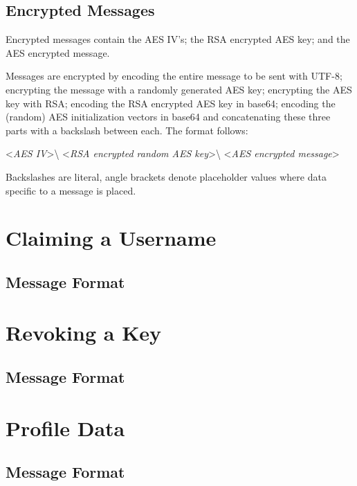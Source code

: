 
\subsection{Encrypted Messages}
Encrypted messages contain the AES IV's; the RSA encrypted AES key; and the AES
encrypted message.

Messages are encrypted by encoding the entire message to be sent with UTF-8;
encrypting the message with a randomly generated AES key; encrypting the AES key
with RSA; encoding the RSA encrypted AES key in base64; encoding the (random)
AES initialization vectors in base64 and concatenating these three parts with a
backslash between each. The format follows:

\begin{center}
\textless \textit{AES IV}\textgreater\textbackslash
\textless \textit{RSA encrypted random AES key}\textgreater\textbackslash
\textless \textit{AES encrypted message}\textgreater
\end{center}

Backslashes are literal, angle brackets denote placeholder values where data
specific to a message is placed.


\section{Claiming a Username}
\subsection{Message Format}

\section{Revoking a Key}
\subsection{Message Format}

\section{Profile Data}
\subsection{Message Format}

